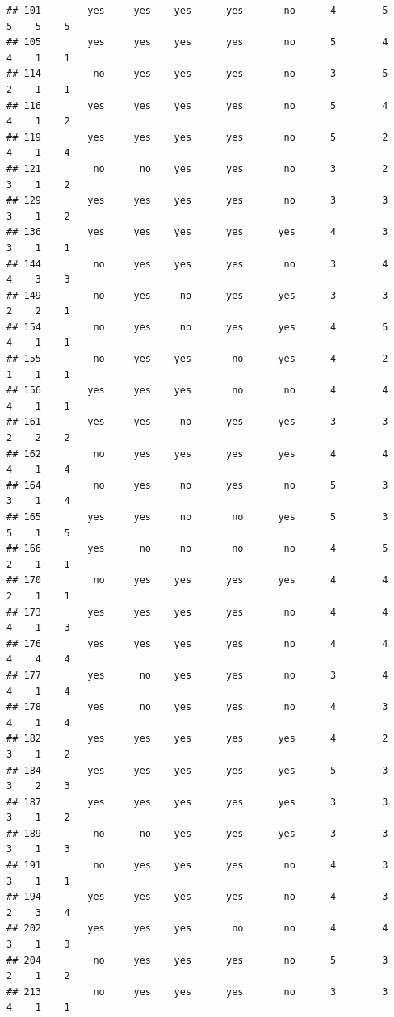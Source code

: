 \documentclass[
]{article}
\begin{document}
\begin{verbatim}
## 101        yes     yes    yes      yes       no      4        5     5    5    5
## 105        yes     yes    yes      yes       no      5        4     4    1    1
## 114         no     yes    yes      yes       no      3        5     2    1    1
## 116        yes     yes    yes      yes       no      5        4     4    1    2
## 119        yes     yes    yes      yes       no      5        2     4    1    4
## 121         no      no    yes      yes       no      3        2     3    1    2
## 129        yes     yes    yes      yes       no      3        3     3    1    2
## 136        yes     yes    yes      yes      yes      4        3     3    1    1
## 144         no     yes    yes      yes       no      3        4     4    3    3
## 149         no     yes     no      yes      yes      3        3     2    2    1
## 154         no     yes     no      yes      yes      4        5     4    1    1
## 155         no     yes    yes       no      yes      4        2     1    1    1
## 156        yes     yes    yes       no       no      4        4     4    1    1
## 161        yes     yes     no      yes      yes      3        3     2    2    2
## 162         no     yes    yes      yes      yes      4        4     4    1    4
## 164         no     yes     no      yes       no      5        3     3    1    4
## 165        yes     yes     no       no      yes      5        3     5    1    5
## 166        yes      no     no       no       no      4        5     2    1    1
## 170         no     yes    yes      yes      yes      4        4     2    1    1
## 173        yes     yes    yes      yes       no      4        4     4    1    3
## 176        yes     yes    yes      yes       no      4        4     4    4    4
## 177        yes      no    yes      yes       no      3        4     4    1    4
## 178        yes      no    yes      yes       no      4        3     4    1    4
## 182        yes     yes    yes      yes      yes      4        2     3    1    2
## 184        yes     yes    yes      yes      yes      5        3     3    2    3
## 187        yes     yes    yes      yes      yes      3        3     3    1    2
## 189         no      no    yes      yes      yes      3        3     3    1    3
## 191         no     yes    yes      yes       no      4        3     3    1    1
## 194        yes     yes    yes      yes       no      4        3     2    3    4
## 202        yes     yes    yes       no       no      4        4     3    1    3
## 204         no     yes    yes      yes       no      5        3     2    1    2
## 213         no     yes    yes      yes       no      3        3     4    1    1

\end{verbatim}
\end{document}
